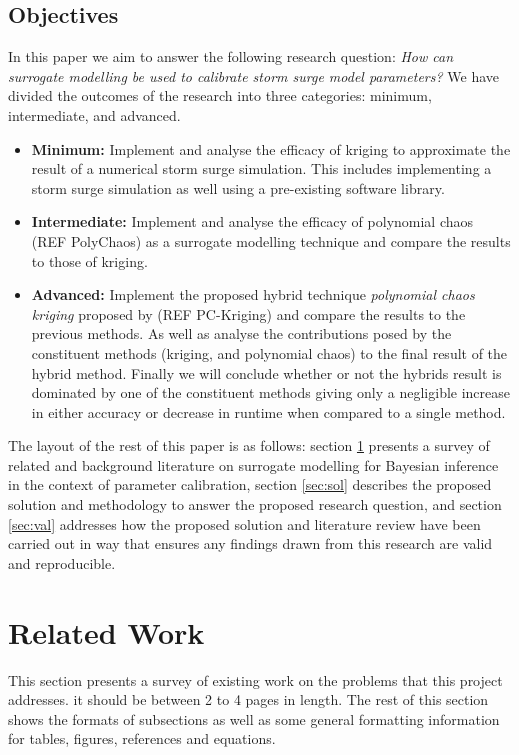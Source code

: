 \documentclass[12pt,a4paper]{article}
\begin{document}
\subsection{Objectives}
\noindent
In this paper we aim to answer the following research question: \textit{How can surrogate modelling be used to calibrate storm surge model parameters?} We have divided the outcomes of the research into three categories: minimum, intermediate, and advanced.
\begin{itemize}
	\item
	\textbf{Minimum: } Implement and analyse the efficacy of kriging to approximate the result of a numerical storm surge simulation. This includes implementing a storm surge simulation as well using a pre-existing software library.
	\item
	\textbf{Intermediate:} Implement and analyse the efficacy of polynomial chaos (REF PolyChaos) as a surrogate modelling technique and compare the results to those of kriging.
	\item
	\textbf{Advanced:} Implement the proposed hybrid technique \textit{polynomial chaos kriging} proposed by (REF PC-Kriging) and compare the results to the previous methods. As well as analyse the contributions posed by the constituent methods (kriging, and polynomial chaos) to the final result of the hybrid method. Finally we will conclude whether or not the hybrids result is dominated by one of the constituent methods giving only a negligible increase in either accuracy or decrease in runtime when compared to a single method.
\end{itemize}

The layout of the rest of this paper is as follows: section \ref{sec:lit} presents a survey of related and background literature on surrogate modelling for Bayesian inference in the context of parameter calibration, section \ref{sec:sol} describes the proposed solution and methodology to answer the proposed research question, and section \ref{sec:val} addresses how the proposed solution and literature review have been carried out in  way that ensures any findings drawn from this research are valid and reproducible.

\section{Related Work} \label{sec:lit}
This section presents a survey of existing work on the problems that this project addresses.  it should be between 2 to 4 pages in length.  The rest of this section shows the formats of subsections as well as some general formatting information for tables, figures, references and equations.
\end{document}

